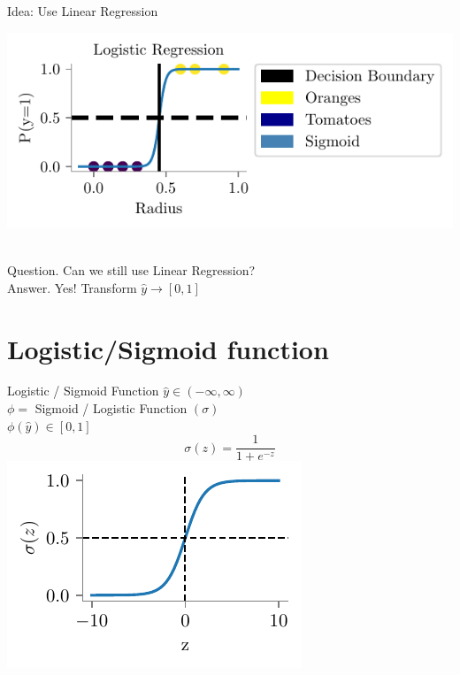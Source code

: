 \documentclass{beamer}
\begin{document}
\begin{frame}{Idea: Use Linear Regression}
\hspace{1cm}
\begin{minipage}{0.3\textwidth}
\includegraphics{../assets/logistic-regression/figures/logistic.pdf}
\end{minipage} \\
Question. Can we still use Linear Regression? \\
Answer. Yes! Transform $\hat{y} \rightarrow [0, 1]$
\end{frame}

\section{Logistic/Sigmoid function}

\begin{frame}{Logistic / Sigmoid Function}
$\hat{y} \in (-\infty, \infty)$ \\
$\phi =$ Sigmoid / Logistic Function $(\sigma)$ \\
$\phi(\hat{y}) \in [0, 1]$
\begin{equation*}
\sigma(z) = \frac{1}{1 + e^{-z}}
\end{equation*}
\includegraphics{../assets/logistic-regression/figures/logistic-function.pdf}
\end{frame}
\end{document}
